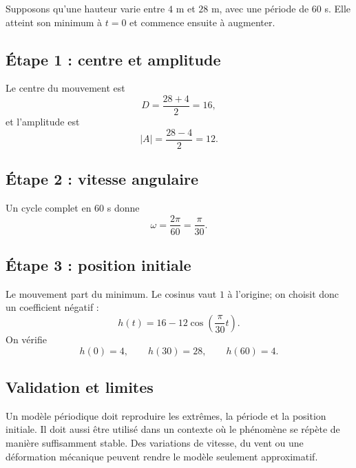 \documentclass[12pt,a4paper,openany]{book}
\begin{document}
Supposons qu'une hauteur varie entre $4$ m et $28$ m, avec une période de $60$ s. Elle atteint son minimum à $t=0$ et commence ensuite à augmenter.

\subsection{Étape 1 : centre et amplitude}
Le centre du mouvement est
\[
D=\frac{28+4}{2}=16,
\]
et l'amplitude est
\[
|A|=\frac{28-4}{2}=12.
\]

\subsection{Étape 2 : vitesse angulaire}
Un cycle complet en $60$ s donne
\[
\omega=\frac{2\pi}{60}=\frac\pi{30}.
\]

\subsection{Étape 3 : position initiale}
Le mouvement part du minimum. Le cosinus vaut $1$ à l'origine; on choisit donc un coefficient négatif :
\[
h(t)=16-12\cos\left(\frac\pi{30}t\right).
\]
On vérifie
\[
h(0)=4,
\qquad
h(30)=28,
\qquad
h(60)=4.
\]

\begin{center}
\end{center}

\subsection{Validation et limites}
Un modèle périodique doit reproduire les extrêmes, la période et la position initiale. Il doit aussi être utilisé dans un contexte où le phénomène se répète de manière suffisamment stable. Des variations de vitesse, du vent ou une déformation mécanique peuvent rendre le modèle seulement approximatif.
\end{document}
